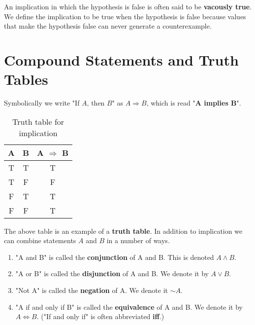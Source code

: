 \documentclass[a4paper, 11pt]{report}
\theoremstyle{plain}
\theoremstyle{definition}
\newcommand{\impl}{\Longrightarrow}
\newcommand{\eqvl}{\Longleftrightarrow}
\renewcommand{\neg}{{\sim}} %
\begin{document}
An implication in which the hypothesis is false is often said to be
\textbf{vacously true}. We define the implication to be
true when the hypothesis is false because values that make the hypothesis false
can never generate a counterexample.

\section{Compound Statements and Truth Tables}
\label{sec:compund_statements_and_truth_tables}

Symbolically we write "If $A$, then $B$" as $A \impl B$\index{$\impl$}, which is
read "\textbf{A implies B}". 

\begin{table}[h!]
  \centering
  \caption{Truth table for implication}
  \label{tab:implication}
  \begin{tabular}{ccc}
    \hline
    A & B & A $\impl$ B \\
    \hline
    T & T & T \\
    T & F & F \\
    F & T & T \\
    F & F & T \\
    \hline
  \end{tabular}
\end{table}

The above table is an example of a \textbf{truth table}.
In addition to implication we can combine statements $A$ and $B$ in a number of ways.
\begin{enumerate}
  \item "A and B" is called the \textbf{conjunction}\index{$\land$} of A and B. This is denoted $A \land B$.
  \item "A or B" is called the \textbf{disjunction}\index{$\lor$} of A and B. We denote it by $A \lor B$.
  \item "Not A" is called the \textbf{negation}\index{$\neg$} of A. We denote it $\neg A$.
  \item "A if and only if B" is called the
    \textbf{equivalence}\index{$\eqvl$} of A and B. We
    denote it by $A \eqvl B$. ("If and only if" is often abbreviated
    \textbf{iff}.)
\end{enumerate}
\end{document}
